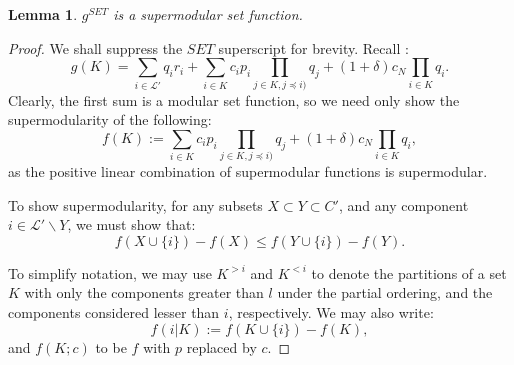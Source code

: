 \documentclass[11pt,authoryear,a4paper]{article}
\newtheorem{lemma}{Lemma}
\theoremstyle{definition}
\begin{document}
\begin{lemma}
\label{lemma:supermodular}
    $g^{SET}$ is a supermodular set function.
\end{lemma}
\begin{proof}
We shall suppress the $SET$ superscript for brevity. Recall :
$$g(K) = \sum_{i\in\mathcal{L}'}q_ir_i + \sum_{i\in K}c_ip_i\prod_{j\in K,j\preceq i)}q_j + (1+\delta)c_N\prod_{i\in K}q_i.$$
Clearly, the first sum is a modular set function, so we need only show the supermodularity of the following:
$$f(K) := \sum_{i\in K}c_ip_i\prod_{j\in K,j\preceq i)}q_j + (1+\delta)c_N\prod_{i\in K}q_i,$$
as the positive linear combination of supermodular functions is supermodular.

To show supermodularity, for any subsets $X\subset Y \subset C'$, and any component $i\in \mathcal{L}'\backslash Y$, we must show that:
$$f(X\cup\{i\}) - f(X) \leq f(Y\cup\{i\}) - f(Y).$$

To simplify notation, we may use $K^{>i}$ and $K^{<i}$ to denote the partitions of a set $K$ with only the components greater than $l$ under the partial ordering, and the components considered lesser than $i$, respectively. We may also write:
$$f(i|K) := f(K\cup\{i\}) - f(K),$$
and $f(K;c)$ to be $f$ with $p$ replaced by $c$.


\end{proof}
\end{document}

